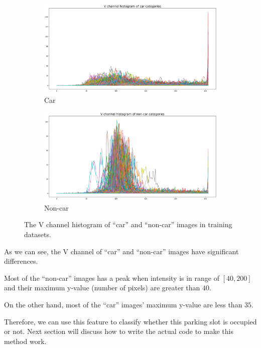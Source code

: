 \documentclass{article}[12pt, twocolumn]
\begin{document}
\begin{figure}[H]
    \centering
    \begin{subfigure}[b]{0.45\textwidth}
        \centering
        \includegraphics[width=\textwidth]{figure/V_car.png}
        \caption{Car}
    \end{subfigure}
    \hfill
    \begin{subfigure}[b]{0.45\textwidth}
        \centering
        \includegraphics[width=\textwidth]{figure/V_noncar.png}
        \caption{Non-car}
    \end{subfigure}
    \caption{The V channel histogram of ``car'' and ``non-car'' images in training datasets.}
    \label{fig:hsv_v}
\end{figure}

As we can see, the V channel of ``car'' and ``non-car'' images have significant differences. 

Most of the ``non-car'' images has a peak when intensity is in range of $[40, 200]$ and their maximum y-value 
(number of pixels) are greater than $40$.

On the other hand, most of the ``car'' images' maximum y-value are less than $35$.

Therefore, we can use this feature to classify whether this parking slot is occupied or not. 
Next section will discuss how to write the actual code to make this method work.
\end{document}
